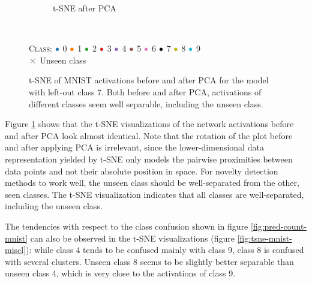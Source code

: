 \documentclass[10pt]{article}
\newcommand{\legendBulletMNIST}{
    \begin{minipage}[t]{0.5\textwidth}
    \centering
    \textsc{Class}:
    ${\color[rgb]{0.12, 0.47, 0.71}\bullet}$ 0
    ${\color[rgb]{1.0, 0.5, 0.05}\bullet}$ 1
    ${\color[rgb]{0.17, 0.63, 0.17}\bullet}$ 2
    ${\color[rgb]{0.84, 0.15, 0.16}\bullet}$ 3
    ${\color[rgb]{0.58, 0.4, 0.74}\bullet}$ 4
    ${\color[rgb]{0.55, 0.34, 0.29}\bullet}$ 5
    ${\color[rgb]{0.89, 0.47, 0.76}\bullet}$ 6
    ${\color[rgb]{0, 0, 0}\bullet}$ 7
    ${\color[rgb]{0.74, 0.74, 0.13}\bullet}$ 8
    ${\color[rgb]{0.09, 0.75, 0.81}\bullet}$ 9\\
    ${\color[rgb]{0.5, 0.5, 0.5}\boldsymbol{\times}}$ Unseen class
    \end{minipage}
    }
\begin{document}
\begin{figure}[H]
\begin{subfigure}{.5\textwidth}
        \caption{\gls{t-SNE} after \gls{PCA}}
    \end{subfigure}
    \\[.2cm]
    \legendBulletMNIST
    \caption{\gls{t-SNE} of \gls{MNIST} activations before and after \gls{PCA} for the model with left-out class 7. Both before and after \gls{PCA}, activations of different classes seem well separable, including the unseen class. }
    \label{fig:tsne-mnist}
\end{figure}

Figure \ref{fig:tsne-mnist} shows that the \gls{t-SNE} visualizations of the network activations before and after \gls{PCA} look almost identical. Note that the rotation of the plot before and after applying \gls{PCA} is irrelevant, since the lower-dimensional data representation yielded by \gls{t-SNE} only models the pairwise proximities between data points and not their absolute position in space. For novelty detection methods to work well, the unseen class should be well-separated from the other, seen classes. The t-SNE visualization indicates that all classes are well-separated, including the unseen class.

The tendencies with respect to the class confusion shown in figure \ref{fig:pred-count-mnist} can also be observed in the \gls{t-SNE} visualizations (figure \ref{fig:tsne-mnist-miscl}): while class 4 tends to be confused mainly with class 9, class 8 is confused with several clusters.  Unseen class 8 seems to be slightly better separable than unseen class 4, which is very close to the activations of class 9.
\end{document}
